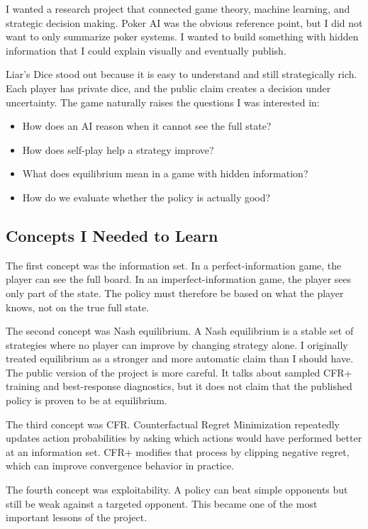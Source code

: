 \documentclass[
]{article}
\providecommand{\tightlist}{%
  \setlength{\itemsep}{0pt}\setlength{\parskip}{0pt}}
\begin{document}
I wanted a research project that connected game theory, machine
learning, and strategic decision making. Poker AI was the obvious
reference point, but I did not want to only summarize poker systems. I
wanted to build something with hidden information that I could explain
visually and eventually publish.

Liar's Dice stood out because it is easy to understand and still
strategically rich. Each player has private dice, and the public claim
creates a decision under uncertainty. The game naturally raises the
questions I was interested in:

\begin{itemize}
\tightlist
\item
  How does an AI reason when it cannot see the full state?
\item
  How does self-play help a strategy improve?
\item
  What does equilibrium mean in a game with hidden information?
\item
  How do we evaluate whether the policy is actually good?
\end{itemize}

\subsection{Concepts I Needed to
Learn}\label{concepts-i-needed-to-learn}

The first concept was the information set. In a perfect-information
game, the player can see the full board. In an imperfect-information
game, the player sees only part of the state. The policy must therefore
be based on what the player knows, not on the true full state.

The second concept was Nash equilibrium. A Nash equilibrium is a stable
set of strategies where no player can improve by changing strategy
alone. I originally treated equilibrium as a stronger and more automatic
claim than I should have. The public version of the project is more
careful. It talks about sampled CFR+ training and best-response
diagnostics, but it does not claim that the published policy is proven
to be at equilibrium.

The third concept was CFR. Counterfactual Regret Minimization repeatedly
updates action probabilities by asking which actions would have
performed better at an information set. CFR+ modifies that process by
clipping negative regret, which can improve convergence behavior in
practice.

The fourth concept was exploitability. A policy can beat simple
opponents but still be weak against a targeted opponent. This became one
of the most important lessons of the project.
\end{document}
